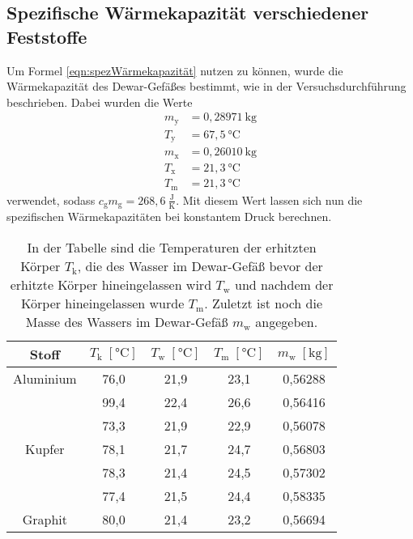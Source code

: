 \documentclass[titlepage = firstcover]{scrartcl}
\begin{document}
        \subsection{Spezifische Wärmekapazität verschiedener Feststoffe}
            Um Formel \eqref{eqn:spezWärmekapazität} nutzen zu können, wurde die Wärmekapazität des Dewar-Gefäßes bestimmt, wie in der Versuchsdurchführung
            beschrieben. Dabei wurden die Werte 
            \begin{align*}
                m_{\text{y}} &= 0,28971 \:\text{kg} \\
                T_{\text{y}} &= 67,5 \:\text{°C} \\
                m_{\text{x}} &= 0,26010 \: \text{kg} \\
                T_{\text{x}} &= 21,3 \:\text{°C} \\
                T_{\text{m}} &= 21,3 \:\text{°C} 
            \end{align*}
            verwendet, sodass $c_\text{g} m_\text{g} = 268,6 \: \frac{\text{J}}{\text{K}}$. Mit diesem Wert lassen sich nun die spezifischen Wärmekapazitäten
            bei konstantem Druck berechnen.
            \begin{table}[h]
                \centering
                \caption{In der Tabelle sind die Temperaturen der erhitzten Körper $T_{\text{k}}$, die des Wasser im Dewar-Gefäß bevor der erhitzte Körper hineingelassen wird $T_{\text{w}}$ und nachdem der Körper hineingelassen wurde $T_{\text{m}}$. Zuletzt ist noch die Masse des Wassers im Dewar-Gefäß $m_{\text{w}}$ angegeben.}
                \label{tab:Tabelle1}

                \begin{tabular}{c c c c c}
                    \toprule
                    {Stoff} & {$T_{\text{k}} \; [\text{°C}] $} & {$T_{\text{w}} \; [\text{°C}]$} &  {$T_{\text{m}} \; [\text{°C}]$} & {$m_{\text{w}} \; [\text{kg}]$}\\
                    \midrule
                    Aluminium & 76,0 & 21,9 & 23,1 & 0,56288 \\
                              & 99,4 & 22,4 & 26,6 & 0,56416 \\
                              & 73,3 & 21,9 & 22,9 & 0,56078 \\
                    Kupfer    & 78,1 & 21,7 & 24,7 & 0,56803 \\
                              & 78,3 & 21,4 & 24,5 & 0,57302 \\
                              & 77,4 & 21,5 & 24,4 & 0,58335 \\
                    Graphit   & 80,0 & 21,4 & 23,2 & 0,56694 \\
                    \bottomrule
                \end{tabular}

            \end{table}
            
\end{document}
